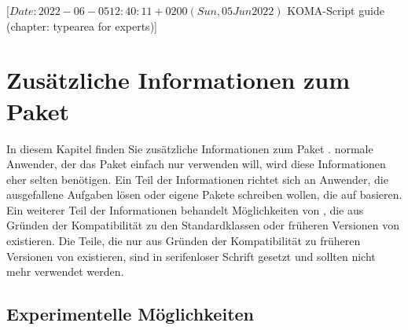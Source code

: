 %
%
%
%
%
%
%

                 [$Date: 2022-06-05 12:40:11 +0200 (Sun, 05 Jun 2022) $
                  KOMA-Script guide (chapter: typearea for experts)]

\chapter{Zusätzliche Informationen zum Paket }

\BeginIndexGroup {} In diesem Kapitel finden Sie
zusätzliche Informationen zum Paket
\hyperref[cha:typearea]{}.  normale Anwender, der das Paket
einfach nur verwenden will, wird diese Informationen eher selten
benötigen. Ein Teil der Informationen richtet sich an Anwender, die
ausgefallene Aufgaben lösen oder eigene Pakete schreiben wollen, die auf
 basieren. Ein weiterer Teil der Informationen behandelt
Möglichkeiten von , die aus Gründen der Kompatibilität zu
den Standardklassen oder früheren Versionen von \KOMAScript{} existieren. Die
Teile, die nur aus Gründen der Kompatibilität zu früheren Versionen von
\KOMAScript{} existieren, sind in serifenloser Schrift gesetzt und sollten
nicht mehr verwendet werden.


\section{Experimentelle Möglichkeiten}

